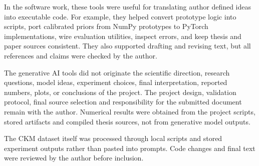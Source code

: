 In the software work, these tools were useful for translating author defined
ideas into executable code. For example, they helped convert prototype logic
into scripts, port calibrated priors from NumPy prototypes to PyTorch
implementations, wire evaluation utilities, inspect errors, and keep thesis and
paper sources consistent. They also supported drafting and revising text, but
all references and claims were checked by the author.

The generative AI tools did not originate the scientific direction, research
questions, model ideas, experiment choices, final interpretation, reported
numbers, plots, or conclusions of the project. The project design, validation
protocol, final source selection and responsibility for the submitted document
remain with the author. Numerical results were obtained from the project
scripts, stored artifacts and compiled thesis sources, not from generative
model outputs.

The CKM dataset itself was processed through local scripts and stored experiment
outputs rather than pasted into prompts. Code changes and final text were
reviewed by the author before inclusion.
